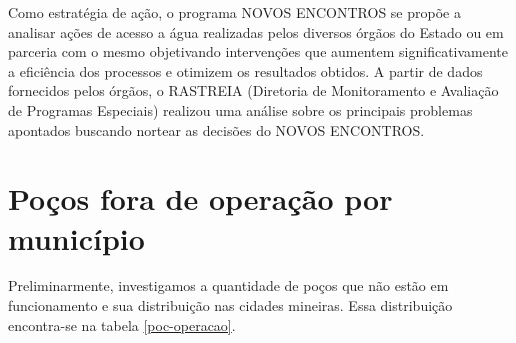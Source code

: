 \documentclass[a4paper, 12pt, openright, oneside, english, brazil, article]{abntex2}
\begin{document}
	Como estratégia de ação, o programa NOVOS ENCONTROS se propõe a analisar ações de acesso a água realizadas pelos diversos órgãos do Estado ou em parceria com o mesmo objetivando intervenções que aumentem significativamente a eficiência dos processos e otimizem os resultados obtidos. A partir de dados fornecidos pelos órgãos, o RASTREIA (Diretoria de Monitoramento e Avaliação de Programas Especiais) realizou uma análise sobre os principais problemas apontados buscando nortear as decisões do NOVOS ENCONTROS.
	
	
	
	\section{Poços fora de operação por município}
	
	Preliminarmente, investigamos a quantidade de poços que não estão em funcionamento e sua distribuição nas cidades mineiras. Essa distribuição encontra-se na tabela \ref{poc-operacao}.
	
\end{document}
